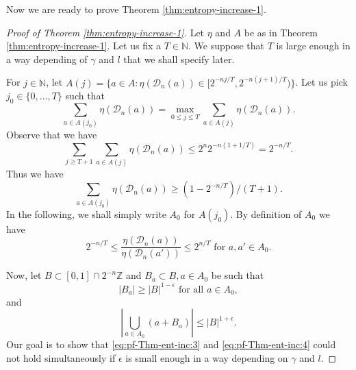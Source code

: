 \documentclass[a4paper,11pt]{amsart}
\theoremstyle{definition}
\numberwithin{equation}{section}
\def\D{\mathcal{D}}
\def\N{\mathbb N}
\def\Z{\mathbb Z}
\begin{document}
Now we are ready to prove Theorem \ref{thm:entropy-increase-1}.  
\begin{proof}[Proof of Theorem \ref{thm:entropy-increase-1}]
Let $\eta$ and $A$ be as in Theorem \ref{thm:entropy-increase-1}.  Let us fix a $T\in \N$.  We suppose that $T$ is large enough in a way depending of $\gamma$ and $l$ that we shall specify later. 

For $j\in \N$,  let $A(j)=\{a\in A: \eta(\D_n(a))\in [2^{-nj/T},2^{-n(j+1)/T}) \}$.  Let us pick $j_0\in \{0,\ldots, T\}$ such that 
\[
\sum_{a\in A(j_0)}\eta(\D_n(a))=\max_{0\le j\le T}\sum_{a\in A(j)}\eta(\D_n(a)).
\]
Observe that we have
\[
\sum_{j\ge T+1}\sum_{a\in A(j)}\eta(\D_n(a))\le 2^n 2^{-n(1+1/T)} =2^{-n/T}.
\]
Thus we have
\begin{equation}\label{eq:pf-Thm-ent-inc:1}
\sum_{a\in A(j_0)}\eta(\D_n(a))\ge (1-2^{-n/T})/(T+1).
\end{equation}
In the following, we shall simply write $A_0$ for $A(j_0)$. 
By definition of $A_0$ we have
\begin{equation}\label{eq:pf-Thm-ent-inc:2}
2^{-n/T}\le \frac{\eta(\D_n(a))}{\eta(\D_n(a'))}\le 2^{n/T} \textrm{ for } a,a'\in A_0.
\end{equation}

Now, let $B\subset [0,1]\cap 2^{-n}\Z$ and $B_a\subset B, a\in A_0$ be such that  
\begin{equation}\label{eq:pf-Thm-ent-inc:3}
|B_a|\ge |B|^{1-\epsilon} \textrm{ for all } a\in A_0,
\end{equation}
and
\begin{equation}\label{eq:pf-Thm-ent-inc:4}
\left|\bigcup_{a\in A_0}(a+B_a)\right|\le |B|^{1+\epsilon}.
\end{equation}
Our goal is to show that \eqref{eq:pf-Thm-ent-inc:3} and \eqref{eq:pf-Thm-ent-inc:4} could not hold simultaneously if $\epsilon$ is small enough in a way depending on $\gamma$ and $l$.


\end{proof}
\end{document}

